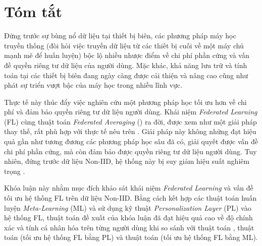 \chapter*{Tóm tắt}
\label{abstract}

Đứng trước sự bùng nổ dữ liệu tại thiết bị biên, các phương pháp máy học truyền thống (đòi hỏi việc truyền dữ liệu từ các thiết bị cuối về một máy chủ mạnh mẽ để huấn luyện) bộc lộ nhiều nhược điểm về chi phí phần cứng và vấn đề quyền riêng tư dữ liệu của người dùng. Mặc khác, khả năng lưu trữ và tính toán tại các thiết bị biên đang ngày càng được cải thiện và nâng cao cũng như phát sự triển vượt bậc của máy học trong nhiều lĩnh vực. 

Thực tế này thúc đẩy việc nghiên cứu một phương pháp học tối ưu hơn về chi phí và đảm bảo quyền riêng tư dữ liệu người dùng. Khái niệm \textit{Federated Learning} (FL) cùng thuật toán \textit{Federated Averaging} () ra đời, được xem như một giải pháp thay thế, rất phù hợp với thực tế nêu trên \cite{mcmahan2017communication}. Giải pháp này không những đạt hiệu quả gần như tương đương các phương pháp học sâu đã có, giải quyết được vấn đề chi phí phần cứng, mà còn đảm bảo được quyền riêng tư dữ liệu người dùng. Tuy nhiên, đứng trước dữ liệu Non-IID, hệ thống này bị suy giảm hiệu suất nghiêm trọng \cite{zhao2018federated}.

Khóa luận này nhằm mục đích khảo sát khái niệm \textit{Federated Learning} và vấn đề tối ưu hệ thống FL trên dữ liệu Non-IID. Bằng cách kết hợp các thuật toán huấn luyện \textit{Meta-Learning} \cite{hospedales2020meta} (ML) và sử dụng kỹ thuật \textit{Personalization Layer} \cite{zhu2021federated} (PL) vào hệ thống FL, thuật toán đề xuất của khóa luận đã đạt hiệu quả cao về độ chính xác và tính cá nhân hóa trên từng người dùng khi so sánh với thuật toán , thuật toán  \cite{arivazhagan2019federated} (tối ưu hệ thống FL bằng PL) và thuật toán  \cite{chen2018federated} (tối ưu hệ thống FL bằng ML).
